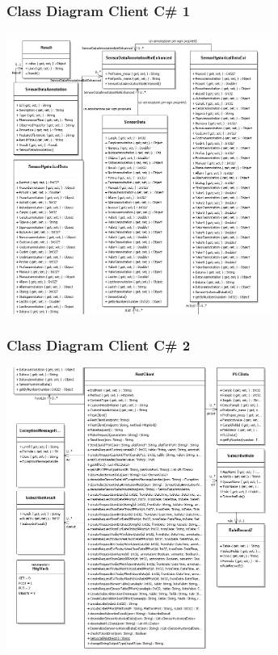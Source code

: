 \documentclass{beamer}
\begin{document}

\begin{frame}
\frametitle{Class Diagram Client C\# 1}
\includegraphics[width=0.65\textwidth]{images/ClassLibrary3v2part1.png}
\end{frame}

\begin{frame}
\frametitle{Class Diagram Client C\# 2}
\includegraphics[width=0.65\textwidth]{images/ClassLibrary3v2part2.png}
\end{frame}
\end{document}
